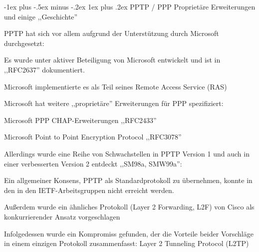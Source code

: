 \documentclass[a4paper]{article}
\makeatletter
\renewcommand{\subsubsection}{\@startsection{subsubsection}{3}{0mm}%
 {-1ex plus -.5ex minus -.2ex}%
 {1ex plus .2ex}%
 {\normalfont\small\bfseries}}
\makeatother
\begin{document}
\begin{multicols}{3}
      \subsubsection{PPTP / PPP Proprietäre Erweiterungen und einige ,,Geschichte''}
      \begin{itemize*}
            \item PPTP hat sich vor allem aufgrund der Unterstützung durch Microsoft durchgesetzt:
            \begin{itemize*}
                  \item Es wurde unter aktiver Beteiligung von Microsoft entwickelt und ist in ,,RFC2637'' dokumentiert.
                  \item Microsoft implementierte es als Teil seines Remote Access Service (RAS)
            \end{itemize*}
            \item Microsoft hat weitere ,,proprietäre'' Erweiterungen für PPP spezifiziert:
            \begin{itemize*}
                  \item Microsoft PPP CHAP-Erweiterungen ,,RFC2433''
                  \item Microsoft Point to Point Encryption Protocol ,,RFC3078''
            \end{itemize*}
            \item Allerdings wurde eine Reihe von Schwachstellen in PPTP Version 1 und auch in einer verbesserten Version 2 entdeckt ,,SM98a, SMW99a'':
            \begin{itemize*}
                  \item Ein allgemeiner Konsens, PPTP als Standardprotokoll zu übernehmen, konnte in den in den IETF-Arbeitsgruppen nicht erreicht werden.
                  \item Außerdem wurde ein ähnliches Protokoll (Layer 2 Forwarding, L2F) von Cisco als konkurrierender Ansatz vorgeschlagen
                  \item Infolgedessen wurde ein Kompromiss gefunden, der die Vorteile beider Vorschläge in einem einzigen Protokoll zusammenfasst: Layer 2 Tunneling Protocol (L2TP)
            \end{itemize*}
      \end{itemize*}


\end{multicols}
\end{document}

